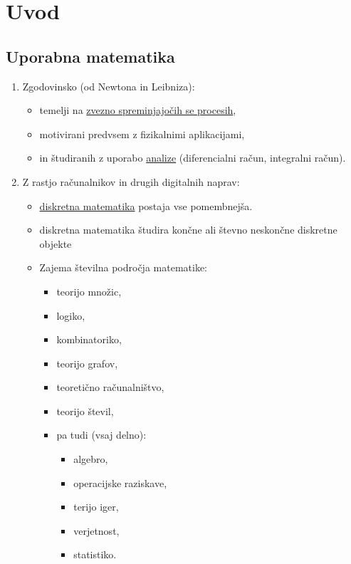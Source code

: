 \section{Uvod}

\subsection{Uporabna matematika}

\begin{enumerate}[label=\alph*)]
    \item Zgodovinsko (od Newtona in Leibniza):
    \begin{itemize}
        \item temelji na \underline{zvezno spreminjajočih se procesih},
        \item motivirani predvsem z fizikalnimi aplikacijami,
        \item in študiranih z uporabo \underline{analize} (diferencialni račun, integralni račun).
    \end{itemize}    
    \item Z rastjo računalnikov in drugih digitalnih naprav:
    \begin{itemize}
        \item \underline{diskretna matematika} postaja vse pomembnejša.
        \item diskretna matematika študira končne ali števno neskončne diskretne objekte
        \item Zajema številna področja matematike: 
        \begin{itemize}
            \item teorijo množic, 
            \item logiko, 
            \item kombinatoriko, 
            \item teorijo grafov, 
            \item teoretično računalništvo, 
            \item teorijo števil, 
            \item pa tudi (vsaj delno): 
            \begin{itemize}
                \item algebro, 
                \item operacijske raziskave, 
                \item terijo iger, 
                \item verjetnost, 
                \item statistiko.
            \end{itemize}
        \end{itemize}
    \end{itemize}
\end{enumerate}

